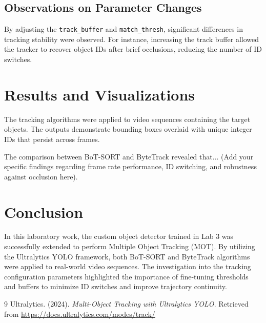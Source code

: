 \documentclass[12pt, a4paper]{article}
\begin{document}
\subsection{Observations on Parameter Changes}
By adjusting the \texttt{track\_buffer} and \texttt{match\_thresh}, significant differences in tracking stability were observed. For instance, increasing the track buffer allowed the tracker to recover object IDs after brief occlusions, reducing the number of ID switches. 

\section{Results and Visualizations}
The tracking algorithms were applied to video sequences containing the target objects. The outputs demonstrate bounding boxes overlaid with unique integer IDs that persist across frames.


The comparison between BoT-SORT and ByteTrack revealed that... (Add your specific findings regarding frame rate performance, ID switching, and robustness against occlusion here).

\section{Conclusion}
In this laboratory work, the custom object detector trained in Lab 3 was successfully extended to perform Multiple Object Tracking (MOT). By utilizing the Ultralytics YOLO framework, both BoT-SORT and ByteTrack algorithms were applied to real-world video sequences. The investigation into the tracking configuration parameters highlighted the importance of fine-tuning thresholds and buffers to minimize ID switches and improve trajectory continuity. 

\vspace{1cm}
\begin{thebibliography}{9}
    Ultralytics. (2024). \textit{Multi-Object Tracking with Ultralytics YOLO}. Retrieved from \url{https://docs.ultralytics.com/modes/track/}
\end{thebibliography}
\end{document}
